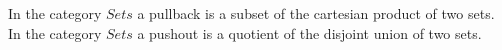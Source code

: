 \begin{frame}
In the category $\textit{Sets}$ a pullback is a subset of the cartesian product of two sets. In the category $\textit{Sets}$ a pushout is a quotient of the disjoint union of two sets.
\end{frame}